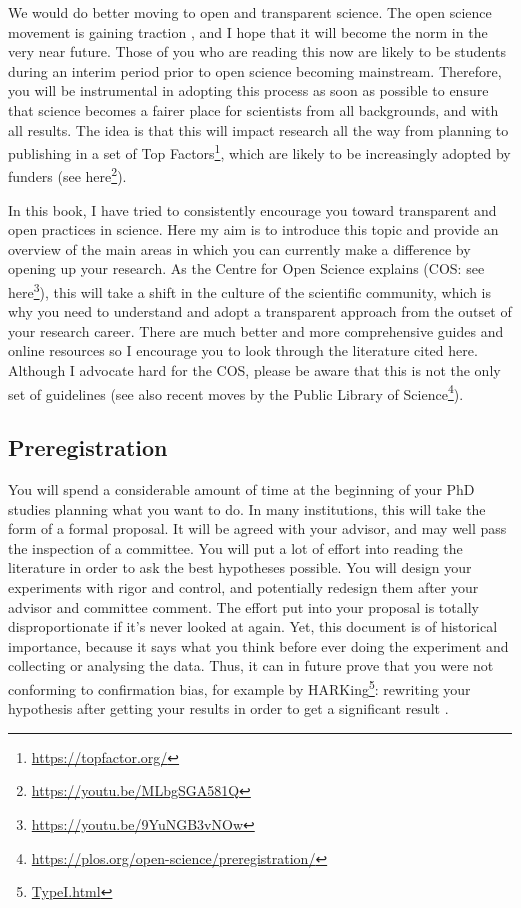 \documentclass[
]{krantz}
\renewcommand{\href}[2]{#2\footnote{\url{#1}}}
\begin{document}
We would do better moving to open and transparent science. The open science movement is gaining traction \citep{sullivan2019open}, and I hope that it will become the norm in the very near future. Those of you who are reading this now are likely to be students during an interim period prior to open science becoming mainstream. Therefore, you will be instrumental in adopting this process as soon as possible to ensure that science becomes a fairer place for scientists from all backgrounds, and with all results. The idea is that this will impact research all the way from planning to publishing in a set of \href{https://topfactor.org/}{Top Factors}, which are likely to be increasingly adopted by funders (see \href{https://youtu.be/MLbgSGA581Q}{here}).

In this book, I have tried to consistently encourage you toward transparent and open practices in science. Here my aim is to introduce this topic and provide an overview of the main areas in which you can currently make a difference by opening up your research. As the Centre for Open Science explains (COS: \href{https://youtu.be/9YuNGB3vNOw}{see here}), this will take a shift in the culture of the scientific community, which is why you need to understand and adopt a transparent approach from the outset of your research career. There are much better and more comprehensive guides and online resources so I encourage you to look through the literature cited here. Although I advocate hard for the COS, please be aware that this is not the only set of guidelines (see also \href{https://plos.org/open-science/preregistration/}{recent moves by the Public Library of Science}).

\hypertarget{preregistration}{%
\subsection{Preregistration}\label{preregistration}}

You will spend a considerable amount of time at the beginning of your PhD studies planning what you want to do. In many institutions, this will take the form of a formal proposal. It will be agreed with your advisor, and may well pass the inspection of a committee. You will put a lot of effort into reading the literature in order to ask the best hypotheses possible. You will design your experiments with rigor and control, and potentially redesign them after your advisor and committee comment. The effort put into your proposal is totally disproportionate if it's never looked at again. Yet, this document is of historical importance, because it says what you think before ever doing the experiment and collecting or analysing the data. Thus, it can in future prove that you were not conforming to confirmation bias, for example by \href{TypeI.html}{HARKing}: rewriting your hypothesis after getting your results in order to get a significant result \citep{kerr1998harking, forstmeier2017detecting}.
\end{document}
